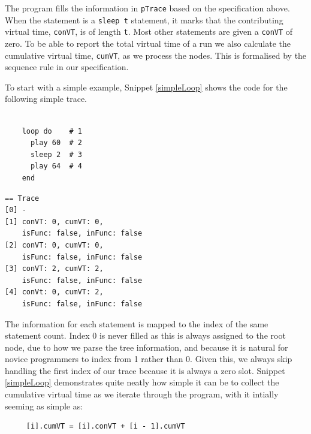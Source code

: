 \documentclass[11pt, abstracton, twoside, titlepage=true]{scrartcl}
\begin{document}
The program fills the information in \texttt{pTrace} based on the specification 
above. When the statement is a \texttt{sleep t} statement, it marks that the 
contributing virtual time, \texttt{conVT}, is of length \texttt{t}. Most other
statements are given a \texttt{conVT} of zero. To be able to report the total
virtual time of a run we also calculate the cumulative virtual time, \texttt{cumVT},
as we process the nodes. This is formalised by the sequence rule in our specification.

To start with a simple example, Snippet \ref{simpleLoop} shows the code for the
following simple trace.

\begin{multicols}{2}
	\begin{minipage}{0.4\textwidth}
		\begin{lstlisting}[style = sonicpi]

    loop do    # 1
      play 60  # 2
      sleep 2  # 3
      play 64  # 4
    end

		\end{lstlisting}
		 \label{simpleLoop}
	\end{minipage}

	\begin{minipage}{0.4\textwidth}
	\begin{lstlisting}
== Trace
[0] -                 
[1] conVT: 0, cumVT: 0, 
    isFunc: false, inFunc: false
[2] conVT: 0, cumVT: 0, 
    isFunc: false, inFunc: false
[3] conVT: 2, cumVT: 2, 
    isFunc: false, inFunc: false
[4] conVt: 0, cumVT: 2, 
    isFunc: false, inFunc: false
	\end{lstlisting}
	\end{minipage}

\end{multicols}

The information for each statement is mapped to the index of the same statement 
count. Index 0 is never filled as this is always assigned to the root node, due
to how we parse the tree information, and because it is natural for novice 
programmers to index from 1 rather than 0. Given this, we always skip handling
the first index of our trace because it is always a zero slot. Snippet 
\ref{simpleLoop} demonstrates quite neatly how simple it can be to collect the
cumulative virtual time as we iterate through the program, with it intially
seeming as simple as:
\\
\begin{lstlisting}
     [i].cumVT = [i].conVT + [i - 1].cumVT
\end{lstlisting}
\end{document}
